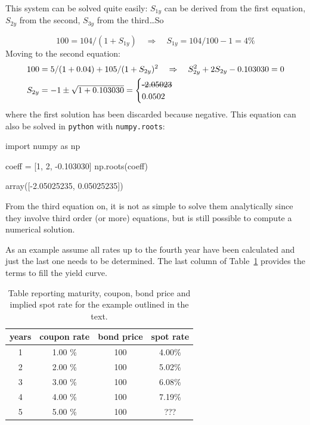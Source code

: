 This system can be solved quite easily: $S_{1y}$ can be derived from the first equation, $S_{2y}$ from the second, $S_{3y}$ from the third\ldots So

\begin{equation}
100 = 104 / (1 + S_{1y})\quad\Rightarrow\quad S_{1y} = 104/100 - 1 = 4\%
\end{equation}
Moving to the second equation:
\begin{equation}
\begin{split}
& 100 = 5 / (1 + 0.04) + 105 / (1 + S_{2y})^{2}\quad\Rightarrow\quad S_{2y}^2  + 2 S_{2y}  - 0.103030 = 0 \\
& S_{2y} = - 1 \pm \sqrt{1 + 0.103030} = \begin{cases}\text{\sout{-2.05023}} \\ 0.0502\end{cases}
\end{split}
\end{equation}
where the first solution has been discarded because negative. This equation can also be solved in \texttt{python} with \texttt{numpy.roots}:
\begin{ipython}
import numpy as np

coeff = [1, 2, -0.103030]
np.roots(coeff)
\end{ipython}
\begin{ioutput}
array([-2.05025235,  0.05025235])
\end{ioutput}

From the third equation on, it is not as simple to solve them analytically since they involve third order (or more) equations, but is still possible to compute a numerical solution.

As an example assume all rates up to the fourth year have been calculated and just the last one needs to be determined. The last column of Table~\ref{tab:rates} provides the terms to fill the yield curve.

\begin{table}[htb]
\begin{center}
\begin{tabular}{|c|c|c|c|}
\hline
\textbf{years} & \textbf{coupon rate} & \textbf{bond price} & \textbf{spot rate} \\
\hline
1 & 1.00 \% & 100 & 4.00\% \\
\hline
2 & 2.00 \% & 100 & 5.02\% \\
\hline
3 & 3.00 \% & 100 & 6.08\% \\
\hline
4 & 4.00 \% & 100 & 7.19\% \\
\hline
5 & 5.00 \% & 100 & ??? \\
\hline
\end{tabular}
\end{center}
\caption{Table reporting maturity, coupon, bond price and implied spot rate for the example outlined in the text.}
\label{tab:rates}
\end{table}

